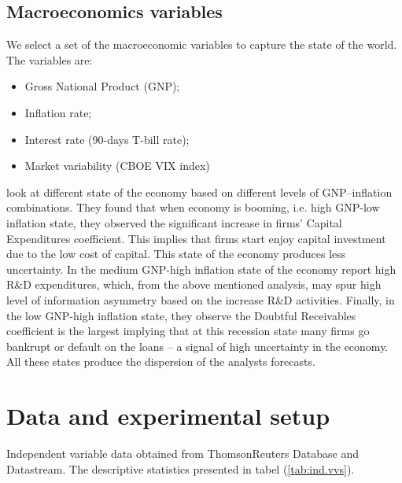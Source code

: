 \subsection{Macroeconomics variables}
We select a set of the macroeconomic variables  to capture the state of the world. The variables are: 
\begin{itemize}
\item Gross National Product (GNP);
\item Inflation rate;
\item Interest rate (90-days T-bill rate);
\item Market variability (CBOE VIX index)
\end{itemize}
\cite{lev1993} look at different state of the economy based on  different levels of GNP--inflation combinations. They found that when economy is booming, i.e. high GNP-low inflation state, they observed the significant increase in firms' Capital Expenditures coefficient. This implies that firms start enjoy capital investment due to the low cost of capital. This state of the economy produces less uncertainty. In the medium GNP-high inflation state of the economy  \cite{lev1993} report high R\&D expenditures, which, from the above mentioned analysis, may spur high level of information asymmetry based on the increase R\&D activities. Finally, in the low GNP-high inflation state, they observe the Doubtful Receivables coefficient is the largest implying that at this recession state many firms go bankrupt or default on the loans -- a signal of high uncertainty in the economy. All these states produce the dispersion of the analysts forecasts.

\section{Data and experimental setup}
\label{sec:data}
Independent variable data obtained from ThomsonReuters Database and Datastream. The descriptive statistics presented in tabel (\ref{tab:ind.vvs}). 

